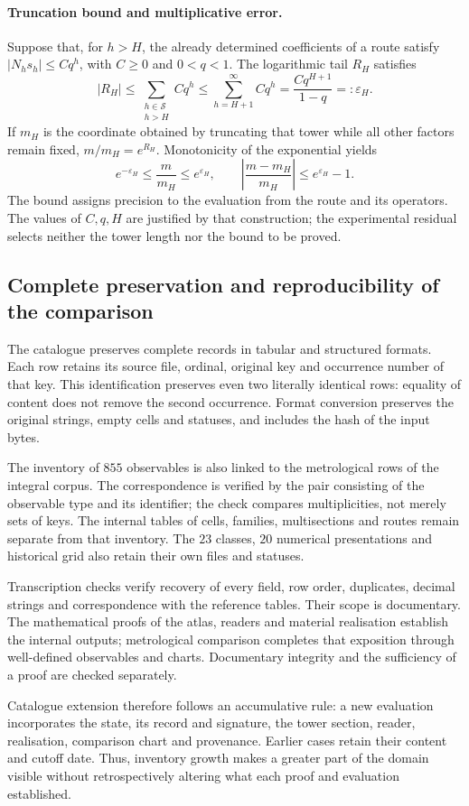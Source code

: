 \paragraph{Truncation bound and multiplicative error.}
Suppose that, for \(h>H\), the already determined coefficients of a
route satisfy \(|N_hs_h|\leq Cq^h\), with \(C\geq0\) and
\(0<q<1\). The logarithmic tail \(R_H\) satisfies
\[
 |R_H|\leq\sum_{\substack{h\in\mathcal S\\h>H}}Cq^h
 \leq\sum_{h=H+1}^{\infty}Cq^h
 =\frac{Cq^{H+1}}{1-q}=:\varepsilon_H.
\]
If \(m_H\) is the coordinate obtained by truncating that tower while all other
factors remain fixed, \(m/m_H=e^{R_H}\). Monotonicity of the
exponential yields
\[
 e^{-\varepsilon_H}\leq\frac{m}{m_H}\leq e^{\varepsilon_H},
 \qquad
 \left|\frac{m-m_H}{m_H}\right|\leq e^{\varepsilon_H}-1.
\]
The bound assigns precision to the evaluation from the route and its
operators. The values of \(C,q,H\) are justified by that
construction; the experimental residual selects neither the tower
length nor the bound to be proved.

\subsection{Complete preservation and reproducibility of the comparison}
\label{subsec:vi-catalogo-reproducible}

The catalogue preserves complete records in tabular and
structured formats. Each row retains its source file, ordinal,
original key and occurrence number of that key. This
identification preserves even two literally identical rows:
equality of content does not remove the second occurrence. Format
conversion preserves the original strings, empty cells and
statuses, and includes the hash of the input bytes.

The inventory of \(855\) observables is also linked to the metrological
rows of the integral corpus. The correspondence is verified
by the pair consisting of the observable type and its identifier;
the check compares multiplicities, not merely sets of keys. The internal
tables of cells, families, multisections and routes remain separate
from that inventory. The \(23\) classes, \(20\) numerical
presentations and historical grid also retain their own files
and statuses.

Transcription checks verify recovery of every
field, row order, duplicates, decimal strings and
correspondence with the reference tables. Their scope is documentary.
The mathematical proofs of the atlas, readers and material realisation
establish the internal outputs; metrological comparison
completes that exposition through well-defined observables and charts.
Documentary integrity and the sufficiency of a proof are
checked separately.

Catalogue extension therefore follows an accumulative rule:
a new evaluation incorporates the state, its record and signature, the tower
section, reader, realisation, comparison chart and
provenance. Earlier cases retain their content and cutoff
date. Thus, inventory growth makes a greater part of the
domain visible without retrospectively altering what each proof and
evaluation established.
